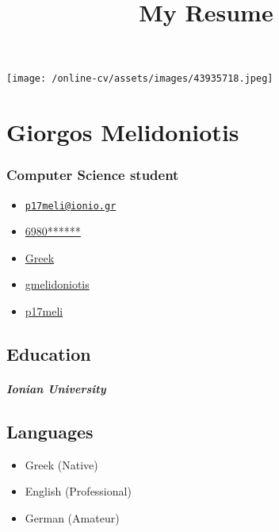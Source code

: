 \documentclass[english,]{article}
\title{My Resume}
\date{}
\providecommand{\tightlist}{%
  \setlength{\itemsep}{0pt}\setlength{\parskip}{0pt}}
\let\oldparagraph\paragraph
\renewcommand{\paragraph}[1]{\oldparagraph{#1}\mbox{}}
\let\oldsubparagraph\subparagraph
\renewcommand{\subparagraph}[1]{\oldsubparagraph{#1}\mbox{}}
\begin{document}
\maketitle

\texttt{[image: /online-cv/assets/images/43935718.jpeg]}

\hypertarget{giorgos-melidoniotis}{%
\section{Giorgos Melidoniotis}\label{giorgos-melidoniotis}}

\hypertarget{computer-science-student}{%
\subsubsection{Computer Science
student}\label{computer-science-student}}

\begin{itemize}
\tightlist
\item
  \emph{} \href{mailto:p17meli@ionio.gr}{\nolinkurl{p17meli@ionio.gr}}
\item
  \emph{} \href{tel:6980******}{6980******}
\item
  \emph{} \href{}{Greek}
\item
  \emph{} \href{https://linkedin.com/in/gmelidoniotis}{gmelidoniotis}
\item
  \emph{} \href{http://github.com/p17meli}{p17meli}
\end{itemize}

\hypertarget{education}{%
\subsection{Education}\label{education}}

\hypertarget{section}{%
\paragraph{}\label{section}}

\hypertarget{ionian-university}{%
\subparagraph{Ionian University}\label{ionian-university}}

\hypertarget{languages}{%
\subsection{Languages}\label{languages}}

\begin{itemize}
\tightlist
\item
  Greek {(Native)}
\item
  English {(Professional)}
\item
  German {(Amateur)}
\end{itemize}
\end{document}
